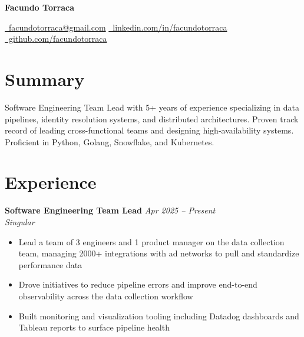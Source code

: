 \documentclass[10pt,a4paper]{article}
\newcommand{\cventry}[3]{%
  \textbf{#1} \hfill \textit{#3}\\[3pt]
  \textit{#2}%
}
\begin{document}
\begin{center}
  {\LARGE\bfseries Facundo Torraca}

  \vspace{0.25cm}

  \href{mailto:facundotorraca@gmail.com}
    {\faEnvelope\ facundotorraca@gmail.com}
  \quad\textperiodcentered\quad
  \href{https://linkedin.com/in/facundotorraca}
    {\faLinkedin\ linkedin.com/in/facundotorraca}
  \quad\textperiodcentered\quad
  \href{https://github.com/facundotorraca}
    {\faGithub\ github.com/facundotorraca}
\end{center}

\section*{Summary}
Software Engineering Team Lead with 5+ years of experience specializing
in data pipelines, identity resolution systems, and distributed
architectures. Proven track record of leading cross-functional teams and
designing high-availability systems. Proficient in Python, Golang,
Snowflake, and Kubernetes.

\section*{Experience}

\cventry{Software Engineering Team Lead}{Singular}{Apr 2025 -- Present}
\begin{itemize}[leftmargin=*, noitemsep, topsep=3pt, itemsep=2pt]
  \item Lead a team of 3 engineers and 1 product manager on the data
        collection team, managing 2000+ integrations with ad networks
        to pull and standardize performance data
  \item Drove initiatives to reduce pipeline errors and improve
        end-to-end observability across the data collection workflow
  \item Built monitoring and visualization tooling including Datadog
        dashboards and Tableau reports to surface pipeline health
\end{itemize}

\vspace{0.25cm}
\end{document}
